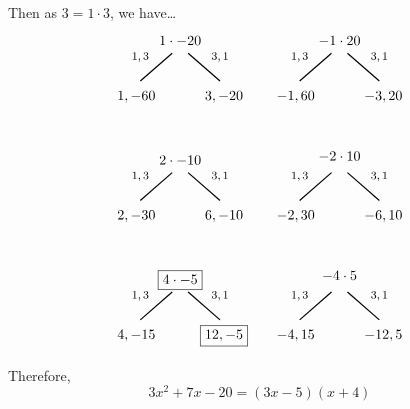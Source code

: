 \documentclass[11pt,letterpaper]{article}
\begin{document}
Then as $3= 1 \cdot 3$, we have\dots
	\[
	\begin{tikzpicture}
	\node at (0,0) {$1 \cdot -20$};
	\node at (-1.0,-0.4) {\footnotesize$1, 3$};
	\draw[line width=0.03cm,label={1}] (-0.2,-0.3) -- (-1,-1);
	\node at (-1.1,-1.4) {$1, -60$};
	\node at (1.0,-0.4) {\footnotesize$3,1$};
	\draw[line width=0.03cm] (0.2,-0.3) -- (1,-1);
	\node at (1.1,-1.4) {$3, -20$};	
	
	\tikzset{shift={(4,0)}}

	\node at (0,0) {$-1 \cdot 20$};
	\node at (-1.0,-0.4) {\footnotesize$1, 3$};
	\draw[line width=0.03cm,label={1}] (-0.2,-0.3) -- (-1,-1);
	\node at (-1.1,-1.4) {$-1, 60$};
	\node at (1.0,-0.4) {\footnotesize$3, 1$};
	\draw[line width=0.03cm] (0.2,-0.3) -- (1,-1);
	\node at (1.1,-1.4) {$-3, 20$};

	\tikzset{shift={(-4,-3)}}

	\node at (0,0) {$2 \cdot -10$};
	\node at (-1.0,-0.4) {\footnotesize$1, 3$};
	\draw[line width=0.03cm,label={1}] (-0.2,-0.3) -- (-1,-1);
	\node at (-1.1,-1.4) {$2, -30$};
	\node at (1.0,-0.4) {\footnotesize$3, 1$};
	\draw[line width=0.03cm] (0.2,-0.3) -- (1,-1);
	\node at (1.1,-1.4) {$6, -10$};

	\tikzset{shift={(4,0)}}

	\node at (0,0.1) {$-2 \cdot 10$};
	\node at (-1.0,-0.4) {\footnotesize$1, 3$};
	\draw[line width=0.03cm,label={1}] (-0.2,-0.3) -- (-1,-1);
	\node at (-1.1,-1.4) {$-2, 30$};
	\node at (1.0,-0.4) {\footnotesize$3, 1$};
	\draw[line width=0.03cm] (0.2,-0.3) -- (1,-1);
	\node at (1.1,-1.4) {$-6, 10$};
	
	\tikzset{shift={(-4,-3)}}

	\node at (0,0) {\framebox{$4 \cdot -5$}};
	\node at (-1.0,-0.4) {\footnotesize$1, 3$};
	\draw[line width=0.03cm,label={1}] (-0.2,-0.3) -- (-1,-1);
	\node at (-1.1,-1.4) {$4, -15$};
	\node at (1.0,-0.4) {\footnotesize$3, 1$};
	\draw[line width=0.03cm] (0.2,-0.3) -- (1,-1);
	\node at (1.1,-1.4) {\framebox{$12, -5$}};

	\tikzset{shift={(4,0)}}

	\node at (0,0.1) {$-4 \cdot 5$};
	\node at (-1.0,-0.4) {\footnotesize$1, 3$};
	\draw[line width=0.03cm,label={1}] (-0.2,-0.3) -- (-1,-1);
	\node at (-1.1,-1.4) {$-4, 15$};
	\node at (1.0,-0.4) {\footnotesize$3, 1$};
	\draw[line width=0.03cm] (0.2,-0.3) -- (1,-1);
	\node at (1.1,-1.4) {$-12, 5$};
	\end{tikzpicture}
	\]

Therefore, 
	\[
	3x^2 + 7x - 20= (3x - 5)(x + 4)
	\]
\end{document}
